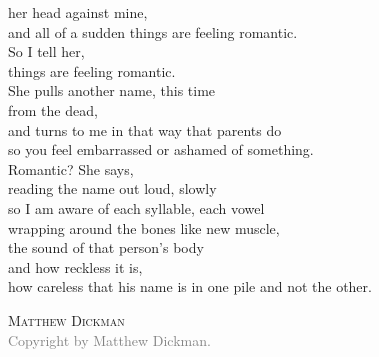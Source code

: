 \documentclass{memoir}
\begin{document}
her head against mine,\\
and all of a sudden things are feeling romantic.\\
So I tell her,\\
things are feeling romantic.\\
She pulls another name, this time\\
from the dead,\\
and turns to me in that way that parents do\\
so you feel embarrassed or ashamed of something.\\
Romantic? She says,\\
reading the name out loud, slowly\\
so I am aware of each syllable, each vowel\\
wrapping around the bones like new muscle,\\
the sound of that person's body\\
and how reckless it is,\\
how careless that his name is in one pile and not the other.

\vspace{11pt}
\hspace{80pt} \textsc{Matthew Dickman}\\
\vfill
\noindent\footnotesize{
\textcolor{gray}{Copyright  by Matthew Dickman.}} 
\end{document}
